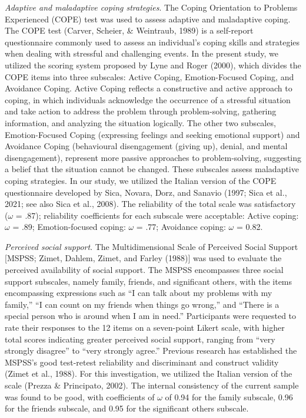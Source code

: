 \documentclass[
  man]{apa6}
\begin{document}
\emph{Adaptive and maladaptive coping strategies}. The Coping Orientation to Problems Experienced (COPE) test was used to assess adaptive and maladaptive coping. The COPE test (Carver, Scheier, \& Weintraub, 1989) is a self-report questionnaire commonly used to assess an individual's coping skills and strategies when dealing with stressful and challenging events. In the present study, we utilized the scoring system proposed by Lyne and Roger (2000), which divides the COPE items into three subscales: Active Coping, Emotion-Focused Coping, and Avoidance Coping. Active Coping reflects a constructive and active approach to coping, in which individuals acknowledge the occurrence of a stressful situation and take action to address the problem through problem-solving, gathering information, and analyzing the situation logically. The other two subscales, Emotion-Focused Coping (expressing feelings and seeking emotional support) and Avoidance Coping (behavioural disengagement (giving up), denial, and mental disengagement), represent more passive approaches to problem-solving, suggesting a belief that the situation cannot be changed. These subscales assess maladaptive coping strategies. In our study, we utilized the Italian version of the COPE questionnaire developed by Sica, Novara, Dorz, and Sanavio (1997; Sica et al., 2021; see also Sica et al., 2008). The reliability of the total scale was satisfactory (\(\omega\) = .87); reliability coefficients for each subscale were acceptable: Active coping: \(\omega\) = .89; Emotion-focused coping: \(\omega\) = .77; Avoidance coping: \(\omega\) = 0.82.

\emph{Perceived social support}. The Multidimensional Scale of Perceived Social Support {[}MSPSS; Zimet, Dahlem, Zimet, and Farley (1988){]} was used to evaluate the perceived availability of social support. The MSPSS encompasses three social support subscales, namely family, friends, and significant others, with the items encompassing expressions such as ``I can talk about my problems with my family,'' ``I can count on my friends when things go wrong,'' and ``There is a special person who is around when I am in need.'' Participants were requested to rate their responses to the 12 items on a seven-point Likert scale, with higher total scores indicating greater perceived social support, ranging from ``very strongly disagree'' to ``very strongly agree.'' Previous research has established the MSPSS's good test-retest reliability and discriminant and construct validity (Zimet et al., 1988). For this investigation, we utilized the Italian version of the scale (Prezza \& Principato, 2002). The internal consistency of the current sample was found to be good, with coefficients of \(\omega\) of 0.94 for the family subscale, 0.96 for the friends subscale, and 0.95 for the significant others subscale.
\end{document}

